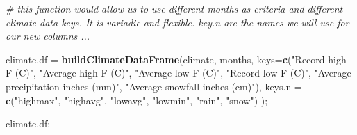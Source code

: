 \documentclass[
]{article}
\newenvironment{Shaded}{\begin{snugshade}}{\end{snugshade}}
\newcommand{\CommentTok}[1]{\textcolor[rgb]{0.56,0.35,0.01}{\textit{#1}}}
\newcommand{\DataTypeTok}[1]{\textcolor[rgb]{0.13,0.29,0.53}{#1}}
\newcommand{\KeywordTok}[1]{\textcolor[rgb]{0.13,0.29,0.53}{\textbf{#1}}}
\newcommand{\NormalTok}[1]{#1}
\newcommand{\StringTok}[1]{\textcolor[rgb]{0.31,0.60,0.02}{#1}}
\begin{document}
\begin{Shaded}
\begin{Highlighting}[]
\CommentTok{\# this function would allow us to use different months as criteria and different climate{-}data keys.  It is variadic and flexible.  \textasciigrave{}key.n\textasciigrave{} are the names we will use for our new columns ...}

\NormalTok{climate.df =}\StringTok{ }\KeywordTok{buildClimateDataFrame}\NormalTok{(climate, months, }\DataTypeTok{keys=}\KeywordTok{c}\NormalTok{(}\StringTok{"Record high F (C)"}\NormalTok{, }\StringTok{"Average high F (C)"}\NormalTok{, }\StringTok{"Average low F (C)"}\NormalTok{, }\StringTok{"Record low F (C)"}\NormalTok{, }\StringTok{"Average precipitation inches (mm)"}\NormalTok{, }\StringTok{"Average snowfall inches (cm)"}\NormalTok{), }\DataTypeTok{keys.n =} \KeywordTok{c}\NormalTok{(}\StringTok{"highmax"}\NormalTok{, }\StringTok{"highavg"}\NormalTok{,  }\StringTok{"lowavg"}\NormalTok{, }\StringTok{"lowmin"}\NormalTok{, }\StringTok{"rain"}\NormalTok{, }\StringTok{"snow"}\NormalTok{) );}

\NormalTok{climate.df;}
\end{Highlighting}
\end{Shaded}
\end{document}
